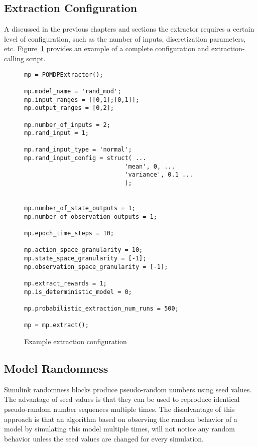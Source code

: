 \subsection{Extraction Configuration}
\label{subsec:extractconf}

A discussed in the previous chapters and sections the extractor requires a certain level of configuration, such as the number of inputs, discretization parameters, etc. Figure~\ref{exmpl_extract_conf} provides an example of a complete configuration and extraction-calling script.

\begin{figure}
\begin{center}
\begin{verbatim}
mp = POMDPExtractor();

mp.model_name = 'rand_mod';
mp.input_ranges = [[0,1];[0,1]];
mp.output_ranges = [0,2];

mp.number_of_inputs = 2;
mp.rand_input = 1;

mp.rand_input_type = 'normal';
mp.rand_input_config = struct( ...
                            'mean', 0, ...
                            'variance', 0.1 ...
                            );


mp.number_of_state_outputs = 1;
mp.number_of_observation_outputs = 1;

mp.epoch_time_steps = 10;

mp.action_space_granularity = 10;
mp.state_space_granularity = [-1];
mp.observation_space_granularity = [-1];

mp.extract_rewards = 1;
mp.is_deterministic_model = 0;

mp.probabilistic_extraction_num_runs = 500;

mp = mp.extract();
\end{verbatim}
\end{center}
\caption{Example extraction configuration}
\label{exmpl_extract_conf}
\end{figure}


\subsection{Model Randomness}
\label{implextrrand}

Simulink randomness blocks produce pseudo-random numbers using seed values. The advantage of seed values is that they can be used to reproduce identical pseudo-random number sequences multiple times. The disadvantage of this approach is that an algorithm based on observing the random behavior of a model by simulating this model multiple times, will not notice any random behavior unless the seed values are changed for every simulation.

